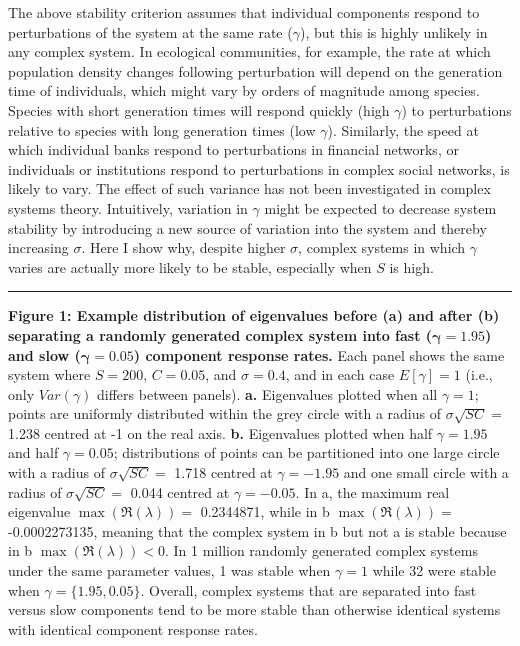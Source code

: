 \documentclass[]{article}
\begin{document}
The above stability criterion assumes that individual components respond
to perturbations of the system at the same rate (\(\gamma\)), but this
is highly unlikely in any complex system. In ecological communities, for
example, the rate at which population density changes following
perturbation will depend on the generation time of individuals, which
might vary by orders of magnitude among species. Species with short
generation times will respond quickly (high \(\gamma\)) to perturbations
relative to species with long generation times (low \(\gamma\)).
Similarly, the speed at which individual banks respond to perturbations
in financial networks, or individuals or institutions respond to
perturbations in complex social networks, is likely to vary. The effect
of such variance has not been investigated in complex systems theory.
Intuitively, variation in \(\gamma\) might be expected to decrease
system stability by introducing a new source of variation into the
system and thereby increasing \(\sigma\). Here I show why, despite
higher \(\sigma\), complex systems in which \(\gamma\) varies are
actually more likely to be stable, especially when \(S\) is high.

\begin{center}\rule{0.5\linewidth}{\linethickness}\end{center}

\textbf{Figure 1: Example distribution of eigenvalues before (a) and
after (b) separating a randomly generated complex system into fast
(\(\boldsymbol{\gamma} = 1.95\)) and slow
(\(\boldsymbol{\gamma} = 0.05\)) component response rates.} Each panel
shows the same system where \(S = 200\), \(C = 0.05\), and
\(\sigma = 0.4\), and in each case \(E[\gamma] = 1\) (i.e., only 
\(Var(\gamma)\) differs between panels). \textbf{a.}
Eigenvalues plotted when all \(\gamma = 1\); points are
uniformly distributed within the grey circle with a radius of
\(\sigma\sqrt{SC} =\) 1.238 centred at -1 on the real axis. \textbf{b.}
Eigenvalues plotted when half \(\gamma = 1.95\) and half
\(\gamma = 0.05\); distributions of points can be partitioned into one
large circle with a radius of \(\sigma\sqrt{SC} =\) 1.718 centred at
\(\gamma = -1.95\) and one small circle with a radius of
\(\sigma\sqrt{SC} =\) 0.044
centred at \(\gamma = -0.05\). In a, the maximum real eigenvalue
\(\max\left(\Re(\lambda)\right) =\) 0.2344871, while in b
\(\max\left(\Re(\lambda)\right) =\) -0.0002273135, meaning that the
complex system in b but not a is stable because in b
\(\max\left(\Re(\lambda)\right) < 0\). In 1 million randomly generated
complex systems under the same parameter values, 1 was stable when
\(\gamma = 1\) while 32 were stable when \(\gamma = \{1.95, 0.05\}\).
Overall, complex systems that are separated into fast versus slow
components tend to be more stable than otherwise identical systems with
identical component response rates.
\end{document}
